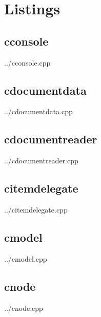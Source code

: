 \documentclass[	a4paper,		%
		titlepage, 		%
		fontsize=12pt		%
		]{scrartcl} 		%
\begin{document}
\section{Listings}
\subsection{cconsole}

	{../cconsole.cpp}

\subsection{cdocumentdata}

	{../cdocumentdata.cpp}

\subsection{cdocumentreader}

	{../cdocumentreader.cpp}

\subsection{citemdelegate}

	{../citemdelegate.cpp}

\subsection{cmodel}

	{../cmodel.cpp}

\subsection{cnode}

	{../cnode.cpp}
\end{document}
